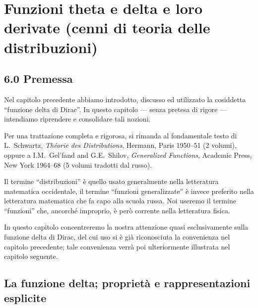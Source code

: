 \documentclass[11pt, a4paper]{book}
\numberwithin{equation}{section}
\begin{document}
\chapter{Funzioni theta e delta e loro derivate (cenni di teoria delle distribuzioni)}

\section*{6.0 Premessa}

Nel capitolo precedente abbiamo introdotto, discusso ed utilizzato la cosiddetta ``funzione delta di Dirac''. In questo capitolo --- senza pretesa di rigore --- intendiamo riprendere e consolidare tali nozioni.

Per una trattazione completa e rigorosa, si rimanda al fondamentale testo di L.~Schwartz, \textit{Théorie des Distributions}, Hermann, Paris 1950--51 (2 volumi), oppure a I.M.~Gel'fand and G.E.~Shilov, \textit{Generalized Functions}, Academic Press, New York 1964--68 (5 volumi tradotti dal russo).

Il termine ``distribuzioni'' è quello usato generalmente nella letteratura matematica occidentale, il termine ``funzioni generalizzate'' è invece preferito nella letteratura matematica che fa capo alla scuola russa. Noi useremo il termine ``funzioni'' che, ancorché improprio, è però corrente nella letteratura fisica.

In questo capitolo concentreremo la nostra attenzione quasi esclusivamente sulla funzione delta di Dirac, del cui uso si è già riconosciuta la convenienza nel capitolo precedente; tale convenienza verrà poi ulteriormente illustrata nel capitolo seguente.

\section{La funzione delta; proprietà e rappresentazioni esplicite}
\end{document}
